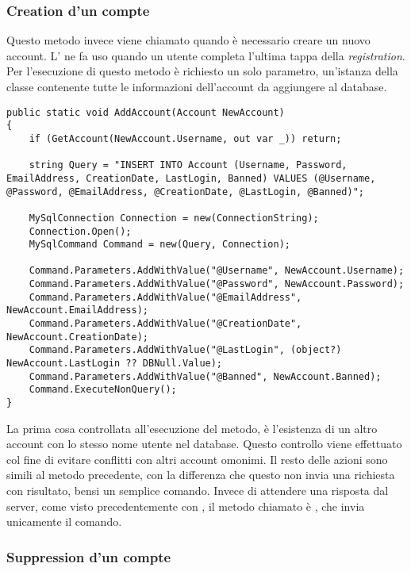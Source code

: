 \documentclass{article}
\begin{document}
\subsubsection{Creation d'un compte}
Questo metodo invece viene chiamato quando è necessario creare un nuovo account. L' ne fa uso quando un utente completa l'ultima tappa della \textit{registration}. Per l'esecuzione di questo metodo è richiesto un solo parametro, un'istanza della classe  contenente tutte le informazioni dell'account da aggiungere al database.

\begin{verbatim}
public static void AddAccount(Account NewAccount)
{
	if (GetAccount(NewAccount.Username, out var _)) return;
	
	string Query = "INSERT INTO Account (Username, Password, EmailAddress, CreationDate, LastLogin, Banned) VALUES (@Username, @Password, @EmailAddress, @CreationDate, @LastLogin, @Banned)";
	
	MySqlConnection Connection = new(ConnectionString);
	Connection.Open();
	MySqlCommand Command = new(Query, Connection);
	
	Command.Parameters.AddWithValue("@Username", NewAccount.Username);
	Command.Parameters.AddWithValue("@Password", NewAccount.Password);
	Command.Parameters.AddWithValue("@EmailAddress", NewAccount.EmailAddress);
	Command.Parameters.AddWithValue("@CreationDate", NewAccount.CreationDate);
	Command.Parameters.AddWithValue("@LastLogin", (object?) NewAccount.LastLogin ?? DBNull.Value);
	Command.Parameters.AddWithValue("@Banned", NewAccount.Banned);
	Command.ExecuteNonQuery();
}
\end{verbatim}

La prima cosa controllata all'esecuzione del metodo, è l'esistenza di un altro account con lo stesso nome utente nel database. Questo controllo viene effettuato col fine di evitare conflitti con altri account omonimi. Il resto delle azioni sono simili al metodo precedente, con la differenza che questo non invia una richiesta con risultato, bensi un semplice comando. Invece di attendere una risposta dal server, come visto precedentemente con , il metodo chiamato è , che invia unicamente il comando.

\subsubsection{Suppression d'un compte}
\end{document}
